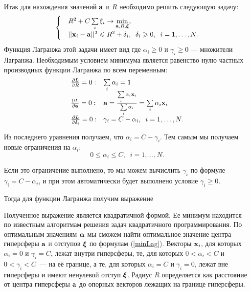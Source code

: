 Итак для нахождения значений $\boldsymbol{\mathbf{a}}$ и $R$ необходимо решить следующую задачу:
\begin{equation}
			\begin{cases}
			&R^2 + C\sum\limits_i\xi_i \to \min\limits_{\boldsymbol{\mathbf{a}}, R,\boldsymbol{\mathbf{\xi}}}, \\
			&||\boldsymbol{\mathbf{x}}_i-\boldsymbol{\mathbf{a}}||^2\leqslant R^2 + \delta_i,\;\;\delta_i\geqslant0,\;\;i = 1,\ldots,N.
			\end{cases} 
\end{equation}
Функция Лагранжа этой задачи имеет вид
где $\alpha_i\ge 0$  и $\gamma_i\ge 0$ --- множители Лагранжа.
Необходимым условием минимума является равенство нулю частных производных функции Лагранжа по всем переменным:
\begin{equation}
	\label{minLag}
	\begin{array}{ll}
		\frac{\partial L}{\partial R} = 0: & \sum\limits_i \alpha_i = 1\\
		\frac{\partial L}{\partial\boldsymbol{\mathbf{a}}} = 0: & \boldsymbol{\mathbf{a}} = \frac{\sum\limits_i\alpha_i\boldsymbol{\mathbf{x}}_i}{\sum\limits_i \alpha_i}= \sum\limits_i \alpha_i\boldsymbol{\mathbf{x}}_i\\
		\frac{\partial L}{\partial\delta_i} = 0: & \gamma_i = C - \alpha_i, \;\; i = 1,\ldots,N.\\
	\end{array}
\end{equation}

Из последнего уравнения получаем, что $\alpha_i = C - \gamma_i$. 
Тем самым мы получаем новые ограничения на $\alpha_i$: 
$$0\le\alpha_i\le C, \;\; i = 1,\ldots,N.$$

Если это ограничение выполнено, то мы можем вычислить $\gamma_i$ по формуле $\gamma_i = C - \alpha_i$, и при этом автоматически будет выполнено условие $\gamma_i\ge 0$.

Тогда для функции Лагранжа получим выражение


Полученное выражение является квадратичной формой. 
Ее минимум находится по известным алгоритмам решения задач квадратичного программирования. 
По оптимальным значениям $\boldsymbol{\mathbf{\alpha}}$ мы сможем найти оптимальное значение центра гиперсферы $\boldsymbol{\mathbf{a}}$ и отступов $\boldsymbol{\mathbf{\xi}}$ по формулам (\ref{minLag}). Векторы $\boldsymbol{\mathbf{x}}_i$, для которых $\alpha_i=0$ и $\gamma_i=C$, лежат внутри гиперсферы, те, для которых $0<\alpha_i<C$ и $0<\gamma_i<C$~--- на её границе, а те, для которых $\alpha_i=C$ и $\gamma_i=0$, лежат вне гиперсферы и имеют ненулевой отступ $\boldsymbol{\mathbf{\xi}}$. 
Радиус $R$ определяется как расстояние от центра гиперсферы $\boldsymbol{\mathbf{a}}$ до опорных векторов лежащих на границе гиперсферы.

